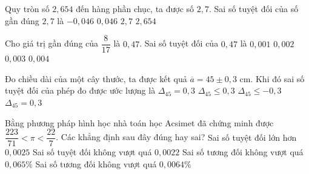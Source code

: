 

\begin{ex}%
	Quy tròn số  $2{,}654$ đến hàng phần chục, ta được số $2{,}7$. Sai số tuyệt đối của số gần đúng $2{,}7$ là
	\choice 
		{$-0{,}046$} 
		{\True $0{,}046$} 
		{$2{,}7$} 
		 {$2{,}654$}
\end{ex}

\begin{ex}%
	Cho  giá trị gần đúng của $\dfrac{8}{17}$ là $0{,}47$. Sai số tuyệt đối của $0{,}47$ là
	\choice 
		 {\True $0{,}001$}
		 {$0{,}002$}
		 {$0{,}003$}
		 {$0{,}004$}
\end{ex}

\begin{ex}%
	Đo chiều dài của một cây thước, ta được kết quả $\overline{a}=45 \pm 0{,}3$ cm. Khi đó sai số  tuyệt đối của phép đo được ước lượng là
	 \choice
		{$\Delta_{45}=0{,}3$} 
		{\True  $\Delta_{45} \leq 0{,}3$}
		{$\Delta_{45}  \leq -0{,}3$}
		{$\Delta_{45}  = 0{,}3$}
\end{ex}



\begin{ex}%
	Bằng phương pháp hình học nhà toán học Acsimet đã  chứng minh được $\dfrac{223}{71} < \pi < \dfrac{22}{7}$.
	Các khẳng  định sau đây đúng hay sai?
	 \choiceTF
		{Sai  số tuyệt đối lớn hơn $0{,}0025$}
		{\True Sai số tuyệt đối không vượt quá $0{,}0022$} 
		{\True Sai số tương đối không  vượt quá $0{,}065\%$}
		{Sai số tương đối  không vượt quá $0{,}0064\%$}
\end{ex}

